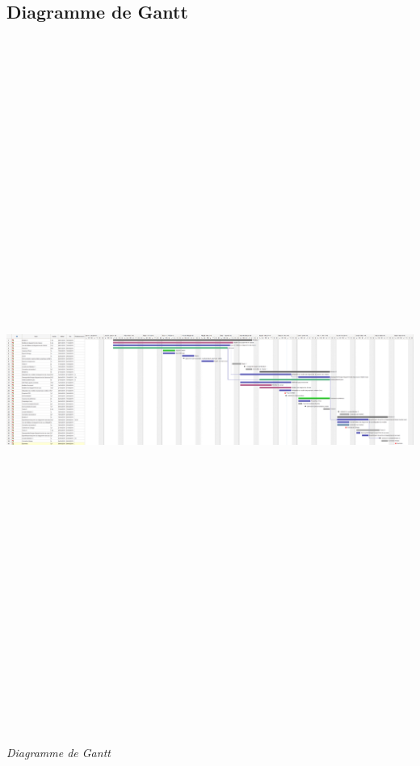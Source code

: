 \documentclass[hidelinks, 10pt,a4paper]{article}
\begin{document}
\subsection{Diagramme de Gantt}
\begin{center}
  \includegraphics[angle=90,height=23cm]{imgPDD/gantt.png}
  \textit{Diagramme de Gantt}
\end{center}
\newpage
 
\end{document}
